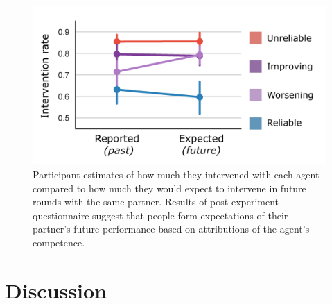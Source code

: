 \documentclass[10pt,letterpaper]{article}
\begin{document}
\begin{figure}[H]
\begin{center}
\includegraphics[width=0.9\linewidth]{img/survey_intervention_expectations_clean.pdf}
\end{center}
\caption{Participant estimates of how much they intervened with each agent compared to how much they would expect to intervene in future rounds with the same partner. Results of post-experiment questionnaire suggest that people form expectations of their partner's future performance based on attributions of the agent's competence.} 
\label{fig:survey}
\end{figure}



\section{Discussion}
\end{document}
